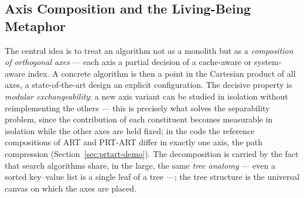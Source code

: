 \begin{nurkurz}
\subsection{Axis Composition and the Living-Being Metaphor}\label{sec:anatomy-metaphor}
The central idea is to treat an algorithm not as a monolith but as a \emph{composition of orthogonal
axes} --- each axis a partial decision of a cache-aware or system-aware index. A concrete algorithm is then
a point in the Cartesian product of all axes, a state-of-the-art design an explicit configuration. The
decisive property is \emph{modular exchangeability}: a new axis variant can be studied in isolation
without reimplementing the others --- this is precisely what solves the separability problem, since the
contribution of each constituent becomes measurable in isolation while the other axes are held fixed; in
the code the reference compositions of ART and PRT-ART differ in exactly one axis, the path compression
(Section~\ref{sec:prtart-demo}). The decomposition is carried by the fact that search algorithms share, in
the large, the same \emph{tree anatomy} --- even a sorted key--value list is a single leaf of a tree ---;
the tree structure is the universal canvas on which the axes are placed.
\end{nurkurz}

